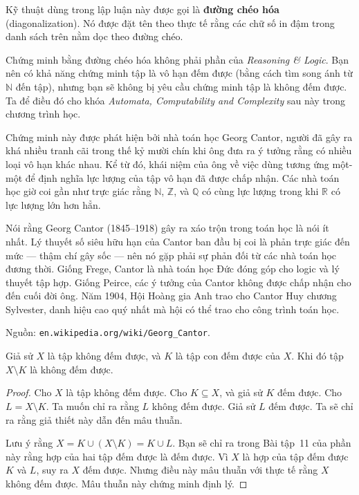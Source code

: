 Kỹ thuật dùng trong lập luận này được gọi là \textbf{đường chéo hóa} (diagonalization). Nó được đặt tên theo thực tế rằng các chữ số in đậm trong danh sách trên nằm dọc theo đường chéo.

\begin{warningbox}
Chứng minh bằng đường chéo hóa không phải phần của \emph{Reasoning \& Logic}. Bạn nên có khả năng chứng minh tập là vô hạn đếm được (bằng cách tìm song ánh từ $\mathbb{N}$ đến tập), nhưng bạn sẽ không bị yêu cầu chứng minh tập là không đếm được. Ta để điều đó cho khóa \emph{Automata, Computability and Complexity} sau này trong chương trình học.
\end{warningbox}

Chứng minh này được phát hiện bởi nhà toán học Georg Cantor, người đã gây ra khá nhiều tranh cãi trong thế kỷ mười chín khi ông đưa ra ý tưởng rằng có nhiều loại vô hạn khác nhau. Kể từ đó, khái niệm của ông về việc dùng tương ứng một-một để định nghĩa lực lượng của tập vô hạn đã được chấp nhận. Các nhà toán học giờ coi gần như trực giác rằng $\mathbb{N}$, $\mathbb{Z}$, và $\mathbb{Q}$ có cùng lực lượng trong khi $\mathbb{R}$ có lực lượng lớn hơn hẳn.

\begin{infobox}
Nói rằng Georg Cantor (1845--1918) gây ra xáo trộn trong toán học là nói ít nhất. Lý thuyết số siêu hữu hạn của Cantor ban đầu bị coi là phản trực giác đến mức --- thậm chí gây sốc --- nên nó gặp phải sự phản đối từ các nhà toán học đương thời. Giống Frege, Cantor là nhà toán học Đức đóng góp cho logic và lý thuyết tập hợp. Giống Peirce, các ý tưởng của Cantor không được chấp nhận cho đến cuối đời ông. Năm 1904, Hội Hoàng gia Anh trao cho Cantor Huy chương Sylvester, danh hiệu cao quý nhất mà hội có thể trao cho công trình toán học.

Nguồn: \texttt{en.wikipedia.org/wiki/Georg\_Cantor}.
\end{infobox}

\begin{theorem}
Giả sử $X$ là tập không đếm được, và $K$ là tập con đếm được của $X$. Khi đó tập $X \setminus K$ là không đếm được.
\end{theorem}

\begin{proof}
Cho $X$ là tập không đếm được. Cho $K \subseteq X$, và giả sử $K$ đếm được. Cho $L = X \setminus K$. Ta muốn chỉ ra rằng $L$ không đếm được. Giả sử $L$ đếm được. Ta sẽ chỉ ra rằng giả thiết này dẫn đến mâu thuẫn.

Lưu ý rằng $X = K \cup (X \setminus K) = K \cup L$. Bạn sẽ chỉ ra trong Bài tập~11 của phần này rằng hợp của hai tập đếm được là đếm được. Vì $X$ là hợp của tập đếm được $K$ và $L$, suy ra $X$ đếm được. Nhưng điều này mâu thuẫn với thực tế rằng $X$ không đếm được. Mâu thuẫn này chứng minh định lý.
\end{proof}

